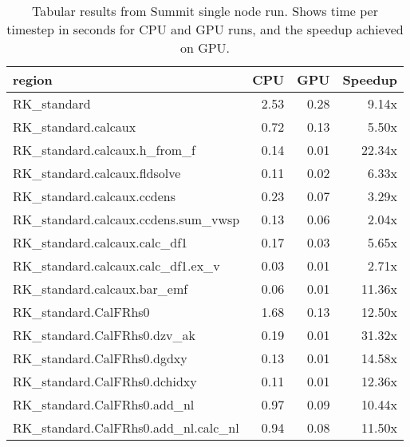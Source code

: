 \begin{table*}[htb]
  \centering
  \begin{tabular}{|l|rrr|}
  \hline
  region & CPU & GPU & Speedup \\
  \hline
  RK{\_}standard                                          &   2.53 &  0.28 &  9.14x \\
  RK{\_}standard.calcaux                                  &   0.72 &  0.13 &  5.50x \\
  RK{\_}standard.calcaux.h{\_}from{\_}f                   &   0.14 &  0.01 & 22.34x \\
  RK{\_}standard.calcaux.fldsolve                         &   0.11 &  0.02 &  6.33x \\
  RK{\_}standard.calcaux.ccdens                           &   0.23 &  0.07 &  3.29x \\
  RK{\_}standard.calcaux.ccdens.sum{\_}vwsp               &   0.13 &  0.06 &  2.04x \\
  RK{\_}standard.calcaux.calc{\_}df1                      &   0.17 &  0.03 &  5.65x \\
  RK{\_}standard.calcaux.calc{\_}df1.ex{\_}v              &   0.03 &  0.01 &  2.71x \\
  RK{\_}standard.calcaux.bar{\_}emf                       &   0.06 &  0.01 & 11.36x \\
  RK{\_}standard.CalFRhs0                                 &   1.68 &  0.13 & 12.50x \\
  RK{\_}standard.CalFRhs0.dzv{\_}ak                       &   0.19 &  0.01 & 31.32x \\
  RK{\_}standard.CalFRhs0.dgdxy                           &   0.13 &  0.01 & 14.58x \\
  RK{\_}standard.CalFRhs0.dchidxy                         &   0.11 &  0.01 & 12.36x \\
  RK{\_}standard.CalFRhs0.add{\_}nl                       &   0.97 &  0.09 & 10.44x \\
  RK{\_}standard.CalFRhs0.add{\_}nl.calc{\_}nl            &   0.94 &  0.08 & 11.50x \\
  \hline
  \end{tabular}
  \caption{Tabular results from Summit single node run. Shows time per timestep in seconds for CPU and GPU runs, and the speedup achieved on GPU.}
  \label{tab:single_node}
\end{table*}
